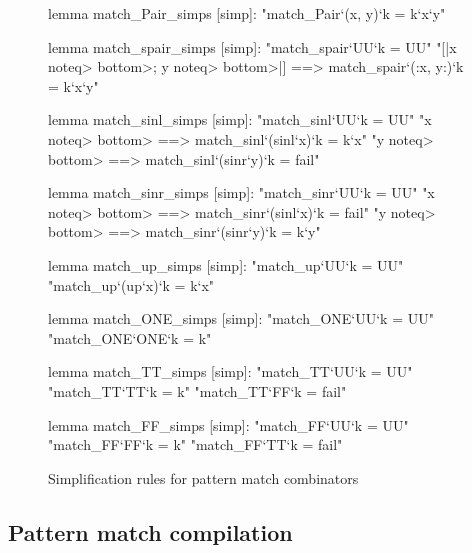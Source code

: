 \begin{figure}
\begin{singlespace}
\begin{minipage}[h]{0.52\linewidth}
\begin{isabelle}
lemma match_Pair_simps [simp]:
  "match_Pair`(x, y)`k = k`x`y"

lemma match_spair_simps [simp]:
  "match_spair`UU`k = UU"
  "[|x \<noteq> \<bottom>; y \<noteq> \<bottom>|]
      ==> match_spair`(:x, y:)`k = k`x`y"

lemma match_sinl_simps [simp]:
  "match_sinl`UU`k = UU"
  "x \<noteq> \<bottom> ==> match_sinl`(sinl`x)`k = k`x"
  "y \<noteq> \<bottom> ==> match_sinl`(sinr`y)`k = fail"

lemma match_sinr_simps [simp]:
  "match_sinr`UU`k = UU"
  "x \<noteq> \<bottom> ==> match_sinr`(sinl`x)`k = fail"
  "y \<noteq> \<bottom> ==> match_sinr`(sinr`y)`k = k`y"
\end{isabelle}
\end{minipage}
\begin{minipage}[h]{0.46\linewidth}
\begin{isabelle}
lemma match_up_simps [simp]:
  "match_up`UU`k = UU"
  "match_up`(up`x)`k = k`x"

lemma match_ONE_simps [simp]:
  "match_ONE`UU`k = UU"
  "match_ONE`ONE`k = k"

lemma match_TT_simps [simp]:
  "match_TT`UU`k = UU"
  "match_TT`TT`k = k"
  "match_TT`FF`k = fail"

lemma match_FF_simps [simp]:
  "match_FF`UU`k = UU"
  "match_FF`FF`k = k"
  "match_FF`TT`k = fail"
\end{isabelle}
\end{minipage}
\end{singlespace}
\caption{Simplification rules for pattern match combinators}
\label{fig:match-simp-rules}
\end{figure}

\subsection{Pattern match compilation}
\label{sec:fixrec-impl-match}

